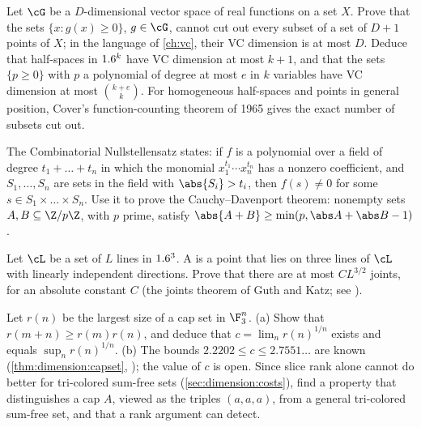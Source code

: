 \begin{refsection}
\begin{exercises}
\item \transfer Let $\cG$ be a $D$-dimensional vector space of real functions on a set $X$. Prove that the sets $\{x:g(x)\ge0\}$, $g\in\cG$, cannot cut out every subset of a set of $D+1$ points of $X$; in the language of \cref{ch:vc}, their VC dimension is at most $D$. Deduce that half-spaces in $1.6^k$ have VC dimension at most $k+1$, and that the sets $\{p\ge0\}$ with $p$ a polynomial of degree at most $e$ in $k$ variables have VC dimension at most $\binom{k+e}{k}$.  For homogeneous half-spaces and points in general position, Cover's function-counting theorem of 1965 gives the exact number of subsets cut out.\label{ex:dimension:vc}

\item \transfer\hard The Combinatorial Nullstellensatz \parencite{Alon1999} states: if $f$ is a polynomial over a field of degree $t_1+\dots+t_n$ in which the monomial $x_1^{t_1}\cdots x_n^{t_n}$ has a nonzero coefficient, and $S_1,\dots,S_n$ are sets in the field with $\abs{S_i}>t_i$, then $f(s)\ne0$ for some $s\in S_1\times\dots\times S_n$. Use it to prove the Cauchy--Davenport theorem: nonempty sets $A,B\subseteq\Z/p\Z$, with $p$ prime, satisfy $\abs{A+B}\ge\min(p,\abs A+\abs B-1)$. \label{ex:dimension:cd}

\item \transfer\harder Let $\cL$ be a set of $L$ lines in $1.6^3$. A  is a point that lies on three lines of $\cL$ with linearly independent directions. Prove that there are at most $CL^{3/2}$ joints, for an absolute constant $C$ (the joints theorem of Guth and Katz; see \textcite{Guth2016}). \label{ex:dimension:joints}

\item \research\harder Let $r(n)$ be the largest size of a cap set in $\F_3^n$. (a) Show that $r(m+n)\ge r(m)r(n)$, and deduce that $c=\lim_nr(n)^{1/n}$ exists and equals $\sup_nr(n)^{1/n}$. (b) The bounds $2.2202\le c\le2.7551\ldots$ are known (\cref{thm:dimension:capset}, \textcite{RomeraParedesEtAl2024}); the value of $c$ is open. Since slice rank alone cannot do better for tri-colored sum-free sets (\cref{sec:dimension:costs}), find a property that distinguishes a cap $A$, viewed as the triples $(a,a,a)$, from a general tri-colored sum-free set, and that a rank argument can detect.\label{ex:dimension:capexponent}


\end{exercises}
\end{refsection}
